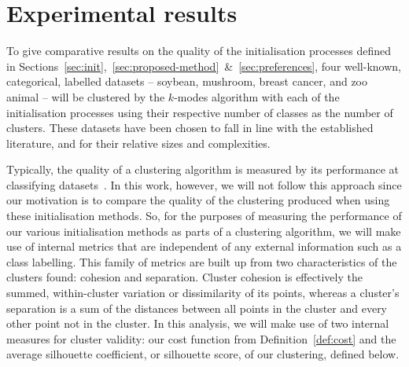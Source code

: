 \section{Experimental results}\label{sec:results}

To give comparative results on the quality of the initialisation processes 
defined in
Sections~\ref{sec:init},~\ref{sec:proposed-method}~\&~\ref{sec:preferences},
four well-known, categorical, labelled datasets \--- soybean, mushroom, breast
cancer, and zoo animal \--- will be clustered by the \(k\)-modes algorithm with
each of the initialisation processes using their respective number of classes as
the number of clusters. These datasets have been chosen to fall in line with the
established literature, and for their relative sizes and complexities.

Typically, the quality of a clustering algorithm is measured by its performance
at classifying datasets~\cite{Cao2009, Huang1998, Olaode2014}. In this work,
however, we will not follow this approach since our motivation is to compare the
quality of the clustering produced when using these initialisation methods. So,
for the purposes of measuring the performance of our various initialisation
methods as parts of a clustering algorithm, we will make use of internal metrics
that are independent of any external information such as a class labelling.
This family of metrics are built up from two characteristics of the clusters
found: cohesion and separation. Cluster cohesion is effectively the summed,
within-cluster variation or dissimilarity of its points, whereas a cluster's
separation is a sum of the distances between all points in the cluster and every
other point not in the cluster. In this analysis, we will make use of two
internal measures for cluster validity: our cost function from
Definition~\ref{def:cost} and the average silhouette coefficient, or silhouette
score, of our clustering, defined below. 

